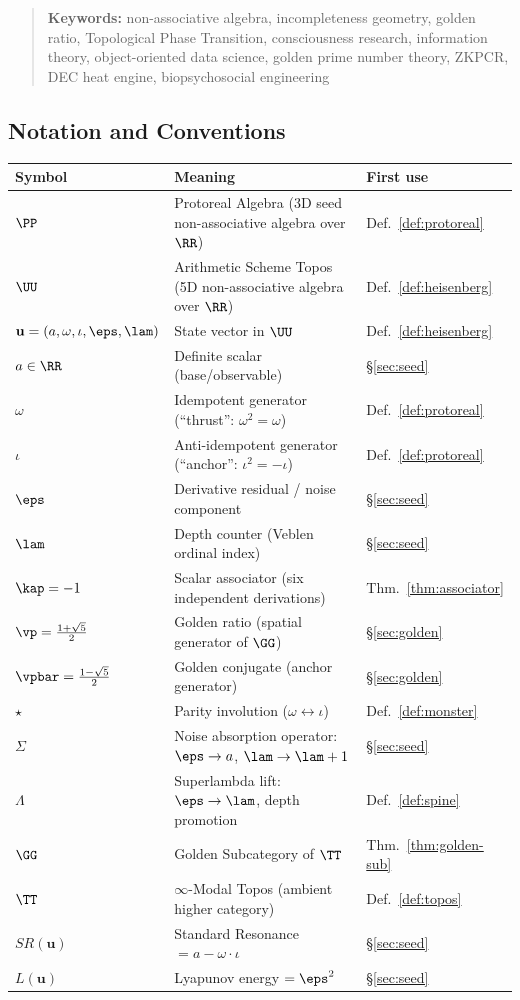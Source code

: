 \begin{quotation}
\medskip\noindent
\textbf{Keywords:} non-associative algebra, incompleteness geometry, golden ratio, Topological Phase Transition, consciousness research, information theory, object-oriented data science, golden prime number theory, ZKPCR, DEC heat engine, biopsychosocial engineering
\end{quotation}

\newpage

\subsection*{Notation and Conventions}

\begin{tabular}{@{}lll@{}}
\toprule
\textbf{Symbol} & \textbf{Meaning} & \textbf{First use} \\
\midrule
$\PP$ & Protoreal Algebra (3D seed non-associative algebra over $\RR$) & Def.~\ref{def:protoreal} \\
$\UU$ & Arithmetic Scheme Topos (5D non-associative algebra over $\RR$) & Def.~\ref{def:heisenberg} \\
$\mathbf{u} = (a, \omega, \iota, \eps, \lam)$ & State vector in $\UU$ & Def.~\ref{def:heisenberg} \\
$a \in \RR$ & Definite scalar (base/observable) & \S\ref{sec:seed} \\
$\omega$ & Idempotent generator (``thrust'': $\omega^2 = \omega$) & Def.~\ref{def:protoreal} \\
$\iota$ & Anti-idempotent generator (``anchor'': $\iota^2 = -\iota$) & Def.~\ref{def:protoreal} \\
$\eps$ & Derivative residual / noise component & \S\ref{sec:seed} \\
$\lam$ & Depth counter (Veblen ordinal index) & \S\ref{sec:seed} \\
$\kap = -1$ & Scalar associator (six independent derivations) & Thm.~\ref{thm:associator} \\
$\vp = \tfrac{1+\sqrt{5}}{2}$ & Golden ratio (spatial generator of $\GG$) & \S\ref{sec:golden} \\
$\vpbar = \tfrac{1-\sqrt{5}}{2}$ & Golden conjugate (anchor generator) & \S\ref{sec:golden} \\
$\star$ & Parity involution ($\omega \leftrightarrow \iota$) & Def.~\ref{def:monster} \\
$\Sigma$ & Noise absorption operator: $\eps \to a$, $\lam \to \lam+1$ & \S\ref{sec:seed} \\
$\Lambda$ & Superlambda lift: $\eps \to \lam$, depth promotion & Def.~\ref{def:spine} \\
$\GG$ & Golden Subcategory of $\TT$ & Thm.~\ref{thm:golden-sub} \\
$\TT$ & $\infty$-Modal Topos (ambient higher category) & Def.~\ref{def:topos} \\
$SR(\mathbf{u})$ & Standard Resonance $= a - \omega \cdot \iota$ & \S\ref{sec:seed} \\
$L(\mathbf{u})$ & Lyapunov energy $= \eps^2$ & \S\ref{sec:seed} \\
\bottomrule
\end{tabular}

